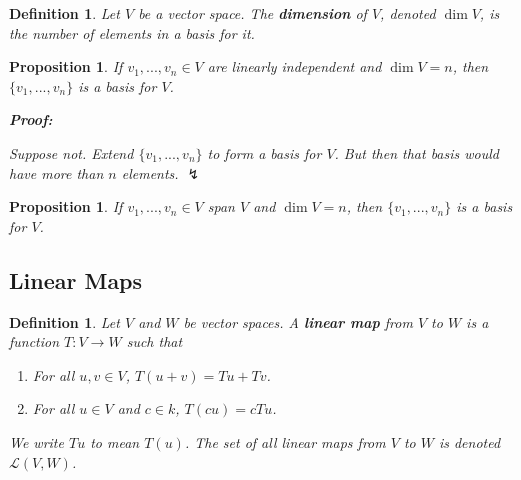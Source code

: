 \documentclass{article}
\theoremstyle{colontheorem}
\newtheorem{proposition}[theorem]{Proposition}
\newtheorem{definition}[theorem]{Definition}
\newenvironment{Proposition}
{
	\begin{mdframed}[backgroundcolor=TheoremOrange!10]
	\begin{proposition}
}
{
	\end{proposition}
	\end{mdframed}
	
	\vspace{.15in}
}
\newenvironment{Def}
{
	\begin{mdframed}[backgroundcolor=DefGreen!10]
	\begin{definition}
}
{
	\end{definition}
	\end{mdframed}
	
	\vspace{.15in}
}
\newenvironment{Proof}
{
	\begin{mdframed}[backgroundcolor=ProofPurple!10]
	\textbf{Proof:}%
}
{
	\end{mdframed}
	
	\vspace{.085in}
}
\begin{document}
\begin{Def}
	
	Let $V$ be a vector space. The \textbf{dimension} of $V$, denoted $\dim V$, is the number of elements in a basis for it.
	
\end{Def}



\begin{Proposition}
	
	If $v_1, ..., v_n \in V$ are linearly independent and $\dim V = n$, then $\{v_1, ..., v_n\}$ is a basis for $V$.
	
	\begin{Proof}
		Suppose not. Extend $\{v_1, ..., v_n\}$ to form a basis for $V$. But then that basis would have more than $n$ elements. $\lightning$
	\end{Proof}
	
\end{Proposition}



\begin{Proposition}
	
	If $v_1, ..., v_n \in V$ span $V$ and $\dim V = n$, then $\{v_1, ..., v_n\}$ is a basis for $V$.
	
\end{Proposition}





\begin{center}
	\pagebreak
	
	\section{Linear Maps}
	
	\vspace{.1in}
\end{center}



\begin{Def}
	
	Let $V$ and $W$ be vector spaces. A \textbf{linear map} from $V$ to $W$ is a function $T: V \longrightarrow W$ such that
	
	\begin{enumerate}
		
		\item For all $u, v \in V$, $T(u+v) = Tu + Tv$.
		\item For all $u \in V$ and $c \in k$, $T(cu) = cTu$.
		
	\end{enumerate}

	We write $Tu$ to mean $T(u)$. The set of all linear maps from $V$ to $W$ is denoted $\mathcal{L}(V, W)$.
	
\end{Def}
\end{document}
